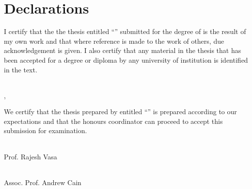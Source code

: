 \newpage
\chapter*{Declarations}

I certify that the the thesis entitled ``\thetitle{}'' submitted for the degree of \thedegree{} is the result of my own work and that where reference is made to the work of others, due acknowledgement is given. I also certify that any material in the thesis that has been accepted for a degree or diploma by any university of institution is identified in the text.

\vspace{2cm}

\noindent
\hspace{\fill}
\parbox[b]{0.4\linewidth}{\hrulefill \\ \raggedleft \theauthor{}, \theauthorspostnominals{} \\ \thedate}

\vspace{3cm}
\noindent
We certify that the thesis prepared by \theauthor{} entitled ``\thetitle{}'' is prepared according to our expectations and that the honours coordinator can proceed to accept this submission for examination.

\vspace{2cm}

\noindent
\hspace{\fill}
\parbox[b]{0.4\linewidth}{\hrulefill \\ \raggedleft Prof. Rajesh Vasa \\ \thedate}
\hspace{1em}
\parbox[b]{0.4\linewidth}{\hrulefill \\ \raggedleft Assoc. Prof. Andrew Cain \\ \thedate}
